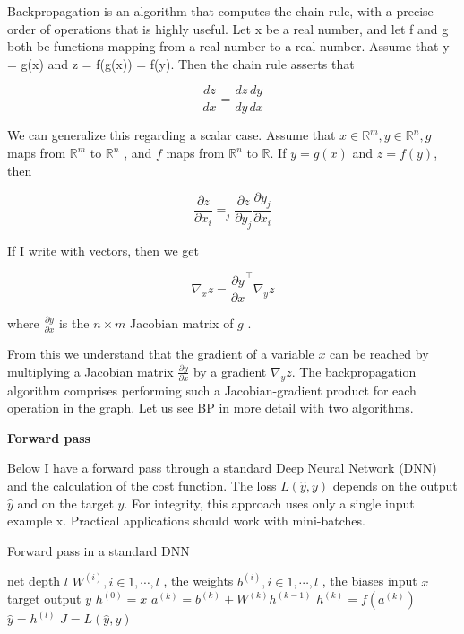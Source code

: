 Backpropagation is an algorithm that computes the chain rule, with a precise order of operations that is highly useful.
Let x be a real number, and let f and g both be functions mapping from a real number to a real number.
Assume that y = g(x) and z = f(g(x)) = f(y).
Then the chain rule asserts that

\begin{equation}
    \frac{dz}{dx} = \frac{dz}{dy} \frac{dy}{dx}\label{eq:equation3}
\end{equation}

We can generalize this regarding a scalar case.
Assume that $x \in \mathbb{R}^m , y \in \mathbb{R}^n , g $ maps from $\mathbb{R}^m$ to $\mathbb{R}^n$ , and $f$ maps
from $\mathbb{R}^n$ to $\mathbb{R}$.
If $y = g(x)$ and $z = f(y)$, then

\begin{equation}
    \frac{\partial z}{\partial x_i} = _{j}^{} \frac{\partial z}{\partial y_j} \frac{\partial y_j}{\partial x_i}\label{eq:equation4}
\end{equation}

If I write with vectors, then we get

\begin{equation}
    \nabla_x z = \frac{\partial y}{\partial x}^\top \nabla_y z\label{eq:equation5}
\end{equation}

where $\frac{\partial y}{\partial x}$ is the $n \times m$ Jacobian matrix of $g$ .

From this we understand that the gradient of a variable $x$ can be reached by multiplying a Jacobian matrix
$\frac{\partial y}{\partial x}$ by a gradient $\nabla_y z$.
The backpropagation algorithm comprises performing such a Jacobian-gradient product for each operation in the graph.
Let us see BP in more detail with two algorithms.

\textbf{Forward pass}

Below I have a forward pass through a standard Deep Neural Network (DNN) and the calculation of the cost function.
The loss $L(\hat{y}, y)$ depends on the output $\hat{y}$ and on the target $y$.
For integrity, this approach uses only a single input example x.
Practical applications should work with mini-batches.

\begin{algorithm}[H]
    \caption{Forward pass in a standard DNN}
    \begin{algorithmic}
        \REQUIRE net depth $l$
        \REQUIRE $W^{(i)} , i \in {1, \cdots , l}$ , the weights
        \REQUIRE $b^{(i)} , i \in {1, \cdots , l}$ , the biases
        \REQUIRE input $x$
        \REQUIRE target output $y$
        \STATE $h^{(0)} = x$
        \STATE $a^{(k)} = b^{(k)} + W^{(k)} h^{(k-1)}$
        \STATE $h^{(k)} = f(a^{(k)})$
        \ENDFOR
        \STATE $\hat{y} = h^{(l)}$
        \STATE $J = L(\hat{y},y)$
    \end{algorithmic}\label{alg:nn_forward_pass}
\end{algorithm}

